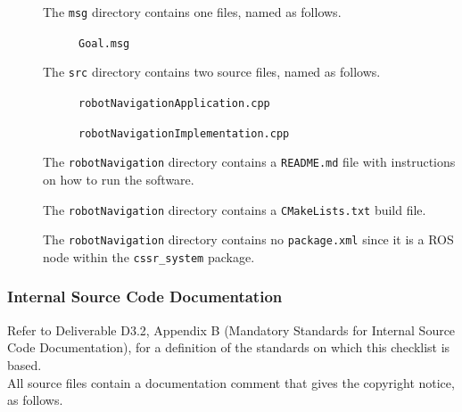 \documentclass{CSSRforAfrica}
\newcommand{\checkboxChecked}{\fbox{\ding{51}}} %
\begin{document}
\begin{description}
\item[\checkboxChecked] The  {\small \verb+msg+} directory contains one files, named as follows.
\begin{description}
\item[\checkboxChecked] {\small \verb+Goal.msg+}  
\end{description} 

\item[\checkboxChecked] The  {\small \verb+src+} directory contains two source files, named as follows.
\begin{description}
\item[\checkboxChecked] {\small \verb+robotNavigationApplication.cpp+}  
\item[\checkboxChecked]  {\small \verb+robotNavigationImplementation.cpp+}  
\end{description}

\item[\checkboxChecked] The {\small \verb+robotNavigation+} directory contains a {\small \verb+README.md+} file with instructions on how to run the software.

\item[\checkboxChecked] The {\small \verb+robotNavigation+} directory contains a {\small \verb+CMakeLists.txt+} build file.

\item[\checkboxChecked] The {\small \verb+robotNavigation+} directory contains no {\small \verb+package.xml+} since it is a ROS node within the {\small \verb+cssr_system+} package.

\end{description}

\subsubsection{Internal Source Code Documentation}

Refer to Deliverable D3.2, Appendix B (Mandatory Standards for Internal Source Code Documentation), for a definition of the standards on which this checklist is based.\\

\noindent All source files contain a documentation comment that gives the copyright notice, as follows.
\end{document}
